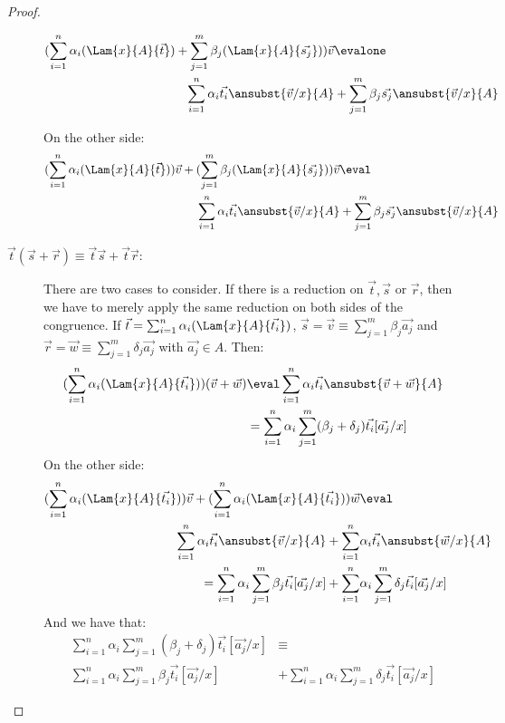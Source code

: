 \begin{proof}
\begin{description}
    \begin{align*}
    (\sum_{i=1}^{n}\alpha_i (\Lam{x}{A}{\vec t})+\sum_{j=1}^{m}\beta_j(\Lam{x}{A}{\vec{s_j}}))\vec{v} &\evalone\\
    \sum_{i=1}^{n}\alpha_i\vec{t_i}\ansubst{\vec{v}/x}{A} &+ \sum_{j=1}^{m}\beta_j\vec{s_j}\ansubst{\vec{v}/x}{A}
    \end{align*}

    On the other side:
    \begin{align*}
    (\sum_{i=1}^{n}\alpha_i (\Lam{x}{A}{\vec t})) \vec{v}+(\sum_{j=1}^{m}\beta_j(\Lam{x}{A}{\vec{s_j}}))\vec{v} &\eval\\
    \sum_{i=1}^{n}\alpha_i\vec{t_i}\ansubst{\vec{v}/x}{A} &+ \sum_{j=1}^{m}\beta_j\vec{s_j}\ansubst{\vec{v}/x}{A}
    \end{align*}

    \item[$\vec{t}(\vec{s}+\vec{r})\equiv\vec{t}\vec{s} + \vec{t}\vec{r}$:] There are two cases to consider. If there is a reduction on $\vec{t},\vec{s}$ or $\vec{r}$, then we have to merely apply the same reduction on both sides of the congruence. If $\vec{t}=\sum_{i=1}^{n}\alpha_i(\Lam{x}{A}{\vec{t_i}})$, $\vec{s}=\vec{v}\equiv\sum_{j=1}^{m}\beta_j \vec{a_j}$ and $\vec{r}=\vec{w}\equiv\sum_{j=1}^{m}\delta_j \vec{a_j}$ with $\vec{a_j}\in A$. Then:
    \begin{align*}
    (\sum_{i=1}^{n}\alpha_i(\Lam{x}{A}{\vec{t_i}}))(\vec{v}+ \vec{w}) &\eval \sum_{i=1}^{n}\alpha_i\vec{t_i}\ansubst{\vec{v}+\vec{w}}{A}\\
    &=\sum_{i=1}^{n}\alpha_i \sum_{j=1}^{m} (\beta_j+\delta_j) \vec{t_i}[\vec{a_j}/x]
  \end{align*}
    On the other side:
    \begin{align*}
      (\sum_{i=1}^{n}\alpha_i(\Lam{x}{A}{\vec{t_i}}))\vec{v} + (\sum_{i=1}^{n}\alpha_i(\Lam{x}{A}{\vec{t_i}}))\vec{w} &\eval\\
      \sum_{i=1}^{n}\alpha_i\vec{t_i}\ansubst{\vec{v}/x}{A} + \sum_{i=1}^{n}&\alpha_i\vec{t_i}\ansubst{\vec{w}/x}{A}\\ 
      =\sum_{i=1}^{n}\alpha_i\sum_{j=1}^{m}\beta_j \vec{t_i}[\vec{a_j}/x] + \sum_{i=1}^{n}&\alpha_i\sum_{j=1}^{m}\delta_j\vec{t_i}[\vec{a_j}/x]\\
    \end{align*}
    And we have that:
    \begin{align*}
    \sum_{i=1}^{n}\alpha_i \sum_{j=1}^{m} (\beta_j+\delta_j) \vec{t_i}[\vec{a_j}/x]&\equiv\\
    \sum_{i=1}^{n}\alpha_i\sum_{j=1}^{m}\beta_j \vec{t_i}[\vec{a_j}/x] &+ \sum_{i=1}^{n}\alpha_i\sum_{j=1}^{m}\delta_j\vec{t_i}[\vec{a_j}/x]
    \end{align*}


\end{description}
\end{proof}
